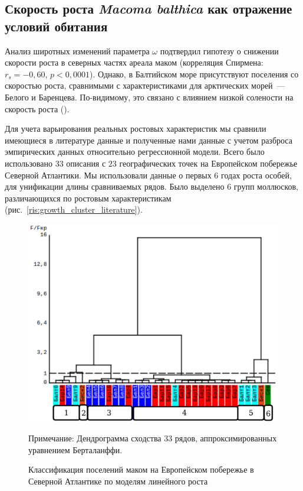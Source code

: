 {{\subsection*{Скорость роста {\it Macoma balthica} как отражение условий обитания}
Анализ широтных изменений параметра $\omega$ подтвердил гипотезу о снижении скорости роста в северных частях ареала маком (корреляция Спирмена: $r_{s} = -0,60$, $p < 0,0001$).
Однако, в Балтийском море присутствуют поселения со скоростью роста, сравнимыми с характеристиками для арктических морей~--- Белого и Баренцева. 
По-видимому, это связано с влиянием низкой солености на скорость роста (\cite{Segerstrale_1960, Kube_et_al_1996}).

Для учета варьирования реальных ростовых характеристик мы сравнили имеющиеся в литературе данные и полученные нами данные с учетом разброса эмпирических данных относительно регрессионной модели.
Всего было использовано $33$ описания с $23$ географических точек на Европейском побережье Северной Атлантики.
Мы использовали данные о первых $6$ годах роста особей, для унификации длины сравниваемых рядов.
Было выделено $6$ групп моллюсков, различающихся по ростовым характеристикам (рис.~\ref{ris:growth_cluster_literature}).
	\begin{figure}[ht]
	\begin{center}	
		\includegraphics[height=0.4\textheight]{../Growth_sravnenie/Europe_clusters_usrednenie.pdf}
	\end{center}
		\caption{Классификация поселений маком на Европейском побережье в Северной Атлантике по моделям линейного роста}
	\footnotesize{Примечание: Дендрограмма сходства 33 рядов, аппроксимированных уравнением Берталанффи. 
}
\end{figure}}}
